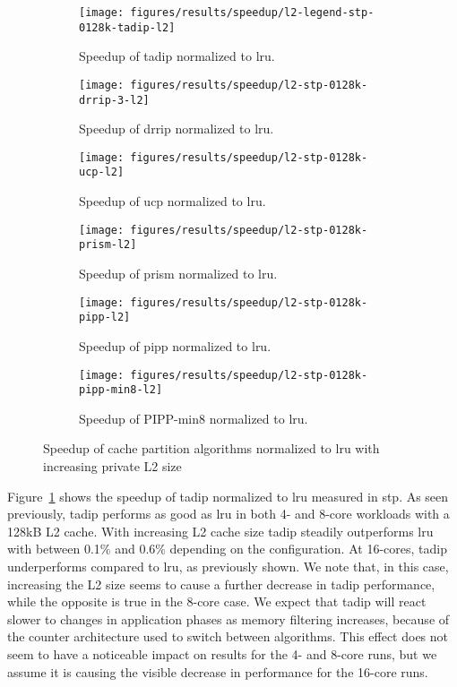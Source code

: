 \begin{figure}[!th]
    \centering
    \begin{subfigure}[b]{0.5\textwidth}
        \texttt{[image: figures/results/speedup/l2-legend-stp-0128k-tadip-l2]}
        \caption{Speedup of \gls{tadip} normalized to \gls{lru}.}
        \label{fig:results:l2:tadip}
    \end{subfigure}%
    \begin{subfigure}[b]{0.5\textwidth}
        \texttt{[image: figures/results/speedup/l2-stp-0128k-drrip-3-l2]}
        \caption{Speedup of \gls{drrip} normalized to \gls{lru}.}
        \label{fig:results:l2:drrip}
    \end{subfigure}
    \begin{subfigure}[b]{0.5\textwidth}
        \texttt{[image: figures/results/speedup/l2-stp-0128k-ucp-l2]}
        \caption{Speedup of \gls{ucp} normalized to \gls{lru}.}
        \label{fig:results:l2:ucp}
    \end{subfigure}%
    \begin{subfigure}[b]{0.5\textwidth}
        \texttt{[image: figures/results/speedup/l2-stp-0128k-prism-l2]}
        \caption{Speedup of \gls{prism} normalized to \gls{lru}.}
        \label{fig:results:l2:prism}
    \end{subfigure}
    \begin{subfigure}[b]{0.5\textwidth}
        \texttt{[image: figures/results/speedup/l2-stp-0128k-pipp-l2]}
        \caption{Speedup of \gls{pipp} normalized to \gls{lru}.}
        \label{fig:results:l2:pipp}
    \end{subfigure}%
    \begin{subfigure}[b]{0.5\textwidth}
        \texttt{[image: figures/results/speedup/l2-stp-0128k-pipp-min8-l2]}
        \caption{Speedup of PIPP-min8 normalized to \gls{lru}.}
        \label{fig:results:l2:pipp-min8}
    \end{subfigure}
    \caption[Speedup with increasing L2 size]{Speedup of cache partition algorithms normalized to \gls{lru} with increasing private L2 size}
    \label{fig:results:l2}
\end{figure}

Figure~\ref{fig:results:l2:tadip} shows the speedup of \gls{tadip} normalized to \gls{lru} measured in \gls{stp}. 
As seen previously, \gls{tadip} performs as good as \gls{lru} in both 4- and 8-core workloads with a 128kB L2 cache.
With increasing L2 cache size \gls{tadip} steadily outperforms \gls{lru} with between 0.1\% and 0.6\% depending on the configuration. 
At 16-cores, \gls{tadip} underperforms compared to \gls{lru}, as previously shown.
We note that, in this case, increasing the L2 size seems to cause a further decrease in \gls{tadip} performance, while the opposite is true in the 8-core case.
We expect that \gls{tadip} will react slower to changes in application phases as memory filtering increases, because of the counter architecture used to switch between algorithms.
This effect does not seem to have a noticeable impact on results for the 4- and 8-core runs, but we assume it is causing the visible decrease in performance for the 16-core runs.

